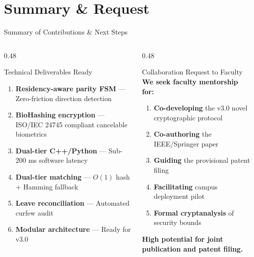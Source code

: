 \documentclass[aspectratio=169, 11pt]{beamer}
\begin{document}
\section{Summary \& Request}

\begin{frame}{Summary of Contributions \& Next Steps}
  \begin{columns}[T]
    \begin{column}{0.48\textwidth}
      \begin{block}{Technical Deliverables Ready}
        \small
        \begin{enumerate}
          \item \textbf{Residency-aware parity FSM} — Zero-friction direction detection
          \item \textbf{BioHashing encryption} — ISO/IEC 24745 compliant cancelable biometrics
          \item \textbf{Dual-tier C++/Python} — Sub-200 ms software latency
          \item \textbf{Dual-tier matching} — $O(1)$ hash + Hamming fallback
          \item \textbf{Leave reconciliation} — Automated curfew audit
          \item \textbf{Modular architecture} — Ready for v3.0
        \end{enumerate}
      \end{block}
    \end{column}
    \begin{column}{0.48\textwidth}
      \begin{exampleblock}{Collaboration Request to Faculty}
        \small
        \textbf{We seek faculty mentorship for:}
        \begin{enumerate}
          \item \textbf{Co-developing} the v3.0 novel cryptographic protocol
          \item \textbf{Co-authoring} the IEEE/Springer paper
          \item \textbf{Guiding} the provisional patent filing
          \item \textbf{Facilitating} campus deployment pilot
          \item \textbf{Formal cryptanalysis} of security bounds
        \end{enumerate}
        \vspace{0.2em}
        \begin{center}
          \colorbox{AccentGold!25}{\parbox{0.88\textwidth}{\centering\scriptsize\bfseries
            High potential for joint publication and patent filing.
          }}
        \end{center}
      \end{exampleblock}
    \end{column}
  \end{columns}
\end{frame}
\end{document}
